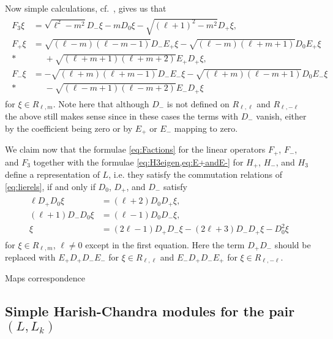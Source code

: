 Now simple calculations, cf.\ , gives us that
\begin{align}\label{eq:Factions}
  \begin{aligned}
    F_3 \xi &= \sqrt{\ell^2-m^2} D_-\xi - m D_0\xi - \sqrt{(\ell+1)^2-m^2}D_+\xi, \\
    F_+ \xi &= \sqrt{(\ell-m)(\ell-m-1)}D_-E_+\xi - \sqrt{(\ell-m)(\ell+m+1)}D_0E_+\xi \\*
    &\phantom{{}={}}{} + \sqrt{(\ell+m+1)(\ell+m+2)}E_+D_+\xi, \\
    F_- \xi &= -\sqrt{(\ell+m)(\ell+m-1)}D_-E_-\xi - \sqrt{(\ell+m)(\ell-m+1)}D_0E_-\xi \\*
    &\phantom{{}={}}{} - \sqrt{(\ell-m+1)(\ell-m+2)}E_-D_+\xi
  \end{aligned}
\end{align}
for $\xi\in R_{\ell,m}$. Note here that although $D_-$ is not defined on $R_{\ell,\ell}$ and $R_{\ell,-\ell}$ the above still makes sense since in these cases the terms with $D_-$ vanish, either by the coefficient being zero or by $E_+$ or $E_-$ mapping to zero.

We claim now that the formulae \cref{eq:Factions} for the linear operators $F_+$, $F_-$, and $F_3$ together with the formulae \cref{eq:H3eigen,eq:E+andE-} for $H_+$, $H_-$, and $H_3$ define a representation of $L$, i.e. they satisfy the commutation relations of \cref{eq:lierels}, if and only if $D_0$, $D_+$, and $D_-$ satisfy
\begin{align}\label{eq:Drels}
  \begin{aligned}
    \ell D_+D_0 \xi &= (\ell+2)D_0 D_+ \xi, \\
    (\ell+1)D_-D_0 \xi &= (\ell-1)D_0D_-\xi, \\
    \xi &= (2\ell-1)D_+D_- \xi - (2\ell+3)D_-D_+\xi - D_0^2\xi
  \end{aligned}
\end{align}
for $\xi\in R_{\ell,m}$, $\ell\neq 0$ except in the first equation. Here the term $D_+D_-$ should be replaced with $E_+D_+D_-E_-$ for $\xi\in R_{\ell,\ell}$ and $E_-D_+D_-E_+$ for $\xi \in R_{\ell,-\ell}$.

\begin{lemma}\label{lem:mapscondition}
  Maps correspondence
\end{lemma}

\subsection{\texorpdfstring{Simple Harish-Chandra modules for the pair $(L,L_k)$}{Simple Harish-Chandra modules for the pair (L,L\_k)}}\label{sec:simplemodules}


